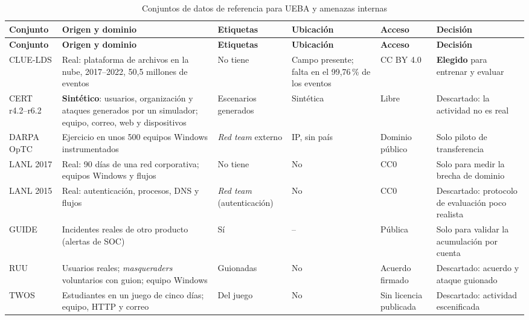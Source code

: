 {\small
\begin{longtable}{>{\raggedright\arraybackslash}p{2.2cm}>{\raggedright\arraybackslash}p{3.1cm}>{\raggedright\arraybackslash}p{2.0cm}>{\raggedright\arraybackslash}p{1.9cm}>{\raggedright\arraybackslash}p{1.9cm}>{\raggedright\arraybackslash}p{3.0cm}}
	\caption{Conjuntos de datos de referencia para UEBA y amenazas internas}
	\label{tab:datasets-referencia}\\
	\hline
	\textbf{Conjunto} & \textbf{Origen y dominio} & \textbf{Etiquetas} & \textbf{Ubicación} & \textbf{Acceso} & \textbf{Decisión} \\
	\hline
	\endfirsthead
	\hline
	\textbf{Conjunto} & \textbf{Origen y dominio} & \textbf{Etiquetas} & \textbf{Ubicación} & \textbf{Acceso} & \textbf{Decisión} \\
	\hline
	\endhead
	CLUE-LDS \parencite{Landauer2022Dataset} & Real: plataforma de archivos en la nube, 2017--2022, 50,5 millones de eventos & No tiene & Campo presente; falta en el 99,76\,\% de los eventos & CC BY 4.0 & \textbf{Elegido} para entrenar y evaluar \\
	\hline
	CERT r4.2--r6.2 \parencite{Glasser2013CERT} & \textbf{Sintético}: usuarios, organización y ataques generados por un simulador; equipo, correo, web y dispositivos & Escenarios generados & Sintética & Libre & Descartado: la actividad no es real \\
	\hline
	DARPA OpTC \parencite{Arantes2021OpTC} & Ejercicio en unos 500 equipos Windows instrumentados & \emph{Red team} externo & IP, sin país & Dominio público & Solo piloto de transferencia \\
	\hline
	LANL 2017 \parencite{Turcotte2018LANL} & Real: 90 días de una red corporativa; equipos Windows y flujos & No tiene & No & CC0 & Solo para medir la brecha de dominio \\
	\hline
	LANL 2015 \parencite{Kent2015} & Real: autenticación, procesos, DNS y flujos & \emph{Red team} (autenticación) & No & CC0 & Descartado: protocolo de evaluación poco realista \parencite{Larroche2026} \\
	\hline
	GUIDE \parencite{Freitas2024GUIDE} & Incidentes reales de otro producto (alertas de SOC) & Sí & -- & Pública & Solo para validar la acumulación por cuenta \\
	\hline
	RUU \parencite{BenSalem2011RUU} & Usuarios reales; \emph{masqueraders} voluntarios con guion; equipo Windows & Guionadas & No & Acuerdo firmado & Descartado: acuerdo y ataque guionado \\
	\hline
	TWOS \parencite{Harilal2018TWOS} & Estudiantes en un juego de cinco días; equipo, HTTP y correo & Del juego & No & Sin licencia publicada & Descartado: actividad escenificada \\

\end{longtable}}
